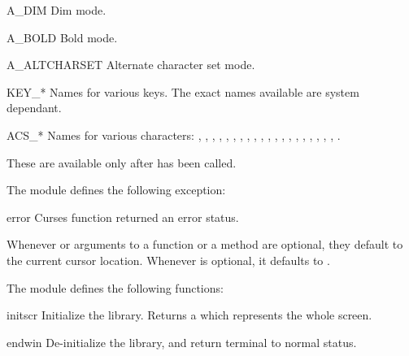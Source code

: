 \begin{datadesc}{A_DIM}
Dim mode.
\end{datadesc}

\begin{datadesc}{A_BOLD}
Bold mode.
\end{datadesc}

\begin{datadesc}{A_ALTCHARSET}
Alternate character set mode.
\end{datadesc}

\begin{datadesc}{KEY_*}
Names for various keys. The exact names available are system dependant.
\end{datadesc}

\begin{datadesc}{ACS_*}
Names for various characters:
, ,
, , ,
, , ,
, , ,
, , ,
, , ,
, , ,
.

 These are available only after  has 
been called.
\end{datadesc}

The module  defines the following exception:
\begin{excdesc}{error}
Curses function returned an error status.
\end{excdesc}

 Whenever  or  arguments to a function
or a method are optional, they default to the current cursor location.
Whenever  is optional, it defaults to .

The module  defines the following functions:

\begin{funcdesc}{initscr}{}
Initialize the library. Returns a  which represents
the whole screen.
\end{funcdesc}

\begin{funcdesc}{endwin}{}
De-initialize the library, and return terminal to normal status.
\end{funcdesc}


